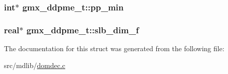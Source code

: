 \hypertarget{structgmx__ddpme__t_a4d467e75c40d72594a2deabf412294e2}{
\subsubsection[{pp\-\_\-min}]{\setlength{\rightskip}{0pt plus 5cm}int$\ast$ {\bf gmx\-\_\-ddpme\-\_\-t\-::pp\-\_\-min}}}\label{structgmx__ddpme__t_a4d467e75c40d72594a2deabf412294e2}
\hypertarget{structgmx__ddpme__t_a870aa66617280d8f01f51555aa894939}{
\subsubsection[{slb\-\_\-dim\-\_\-f}]{\setlength{\rightskip}{0pt plus 5cm}real$\ast$ {\bf gmx\-\_\-ddpme\-\_\-t\-::slb\-\_\-dim\-\_\-f}}}\label{structgmx__ddpme__t_a870aa66617280d8f01f51555aa894939}


\-The documentation for this struct was generated from the following file\-:\begin{DoxyCompactItemize}
\item 
src/mdlib/\hyperlink{domdec_8c}{domdec.\-c}\end{DoxyCompactItemize}

